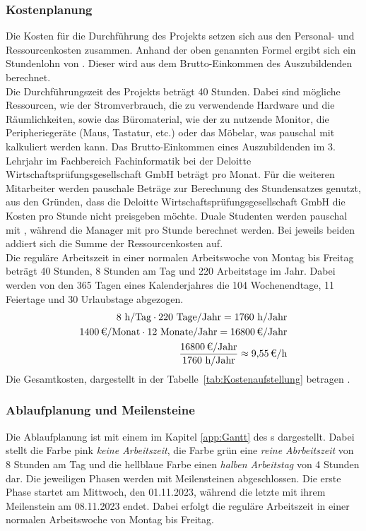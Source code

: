 \subsubsection{Kostenplanung}
\label{sec:Kostenplanung}
Die Kosten für die Durchführung des Projekts setzen sich aus den Personal- und Ressourcenkosten zusammen.   
Anhand der oben genannten Formel ergibt sich ein Stundenlohn von . Dieser wird aus dem Brutto-Einkommen des Auszubildenden berechnet.
\\Die Durchführungszeit des Projekts beträgt 40 Stunden. 
Dabei sind mögliche Ressourcen, wie der Stromverbrauch, die zu verwendende Hardware und die Räumlichkeiten, sowie das Büromaterial, 
wie \zB der zu nutzende Monitor, die Peripheriegeräte (Maus, Tastatur, etc.) oder das Möbelar, was pauschal mit  kalkuliert werden kann. 
Das Brutto-Einkommen eines Auszubildenden im 3. Lehrjahr im Fachbereich Fachinformatik bei der Deloitte Wirtschaftsprüfungsgesellschaft GmbH 
beträgt  pro Monat. 
Für die weiteren Mitarbeiter werden pauschale Beträge zur Berechnung des Stundensatzes genutzt, aus den Gründen, dass die 
Deloitte Wirtschaftsprüfungsgesellschaft GmbH die Kosten pro Stunde nicht preisgeben möchte. Duale Studenten werden pauschal mit 
, während die Manager mit  pro Stunde berechnet werden. Bei jeweils beiden addiert sich die Summe der 
Ressourcenkosten auf.
\\Die reguläre Arbeitszeit in einer normalen Arbeitswoche von Montag bis Freitag beträgt 40 Stunden, 8 Stunden am Tag und 
220 Arbeitstage im Jahr. Dabei werden von den 365 Tagen eines Kalenderjahres die 104 Wochenendtage, 11 Feiertage und 30 Urlaubstage abgezogen.
\begin{eqnarray}
	8 \mbox{ h/Tag} \cdot 220 \mbox{ Tage/Jahr} = 1760 \mbox{ h/Jahr}\\
	\eur{1400}\mbox{/Monat} \cdot 12 \mbox{ Monate/Jahr} = \eur{16800} \mbox{/Jahr}\\
	\frac{\eur{16800} \mbox{/Jahr}}{1760 \mbox{ h/Jahr}} \approx \eur{9,55}\mbox{/h}
\end{eqnarray}
Die Gesamtkosten, dargestellt in der Tabelle~\ref{tab:Kostenaufstellung} betragen .

\subsubsection{Ablaufplanung und Meilensteine}
\label{sec:Ablaufplaung und Meilensteine}
Die Ablaufplanung ist mit einem  im Kapitel \ref{app:Gantt} des s dargestellt. 
Dabei stellt die Farbe pink \textit{keine Arbeitszeit}, die Farbe grün eine \textit{reine Abrbeitszeit} 
von 8 Stunden am Tag und die hellblaue Farbe einen \textit{halben Arbeitstag} von 4 Stunden dar. Die jeweiligen Phasen 
werden mit Meilensteinen abgeschlossen. Die erste Phase startet am Mittwoch, den 01.11.2023, während die letzte 
mit ihrem Meilenstein am 08.11.2023 endet. Dabei erfolgt die reguläre Arbeitszeit in einer normalen Arbeitswoche 
von Montag bis Freitag.

